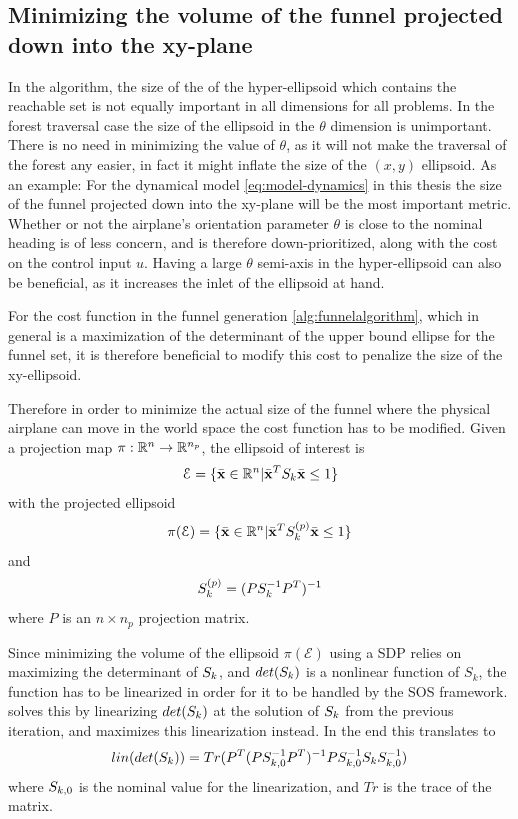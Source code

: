 \subsection{Minimizing the volume of the funnel projected down into the
  xy-plane}
\label{subsec:xy-cost-function}

In the \rrtfunnel{} algorithm, the size of the of the hyper-ellipsoid which
contains the reachable set is not equally important in all dimensions for all
problems. In the forest traversal case the size of the ellipsoid in the
\(\theta\) dimension is unimportant. There is no need in minimizing the value of
\(\theta\), as it will not make the traversal of the forest any easier, in fact
it might inflate the size of the \((x,y)\) ellipsoid. As an example: For the
dynamical model \eqref{eq:model-dynamics} in this thesis the size of the funnel
projected down into the xy-plane will be the most important metric. Whether or
not the airplane's orientation parameter \(\theta\) is close to the nominal
heading is of less concern, and is therefore down-prioritized, along with the
cost on the control input \(u\). Having a large \(\theta\) semi-axis in the
hyper-ellipsoid can also be beneficial, as it increases the inlet of the
ellipsoid at hand.

For the cost function in the funnel generation \cref{alg:funnelalgorithm}, which
in general is a maximization of the determinant of the upper bound ellipse for
the funnel set, it is therefore beneficial to modify this cost to penalize the
size of the xy-ellipsoid.

Therefore in order to minimize the actual size of the funnel where the physical
airplane can move in the world space the cost function has to be modified. Given
a projection map \(\pi : \mathbb{R}^n \rightarrow \mathbb{R}^{n_p}\), the ellipsoid of interest
is
\[
  \mathcal{E} = \lbrace\bar{\mathsf{\mathbf{x}}} \in \mathbb{R}^n |
    \bar{\mathsf{\mathbf{x}}}^TS_{k}\bar{\mathsf{\mathbf{x}}} \leq 1\rbrace
\]
with the projected ellipsoid
\[
  \pi(\mathcal{E}) = \lbrace\bar{\mathsf{\mathbf{x}}} \in \mathbb{R}^n |
    \bar{\mathsf{\mathbf{x}}}^TS^{(p)}_{k}\bar{\mathsf{\mathbf{x}}} \leq 1\rbrace
\]
and
\[
  S_k^{(p)} = \lparen PS_k^{-1}P^T\rparen^{-1}
\]
where \(P\) is an \(n\times n_p\) projection matrix.

Since minimizing the volume of the ellipsoid \(\pi(\mathcal{E})\) using a
\ac{SDP} relies on maximizing the determinant of \(S_k\), and \(det(
S_k)\) is a nonlinear function of \(S_k\), the function has to be
linearized in order for it to be handled by the \ac{SOS} framework.
\cite[Majumdar]{majumdarFunnelLibrariesRealtime2017} solves this by linearizing
\(det(S_k)\) at the solution of \(S_k\) from the previous
iteration, and maximizes this linearization instead. In the end this translates
to
\[
  \mathnormal{lin}\lparen det\lparen S_k\rparen\rparen = Tr\lparen P^T\lparen P
      S_{k,0}^{-1} P^T\rparen^{-1} P S_{k,0}^{-1}
    S_k S_{k,0}^{-1}\rparen
\]
where \( S_{k,0}\) is the nominal value for the linearization, and \(Tr\)
is the trace of the matrix.

